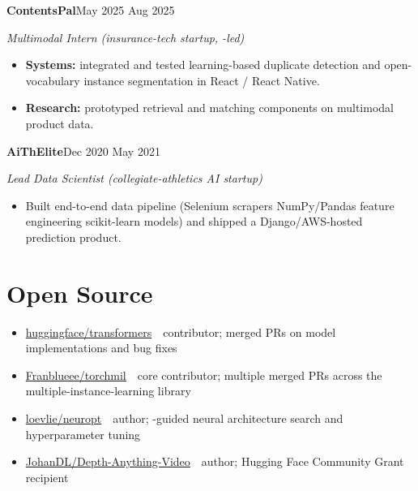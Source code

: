 \documentclass[10pt,letterpaper]{article}
\newcommand{\sansfam}{\sffamily}
\newcommand{\monofam}{\ttfamily}
\newcommand{\datestamp}[1]{{\sansfam\footnotesize\color{meta}\figureversion{lf}#1}}
\newcommand{\role}[2]{%
  \filbreak%
  \par\vspace{1pt}%
  \noindent\textbf{#1}\hfill\datestamp{#2}\par\nopagebreak}
\newcommand{\sub}[1]{\noindent\textit{\footnotesize\color{meta} #1}\par\nopagebreak}
\newcommand{\acro}[1]{\textls[80]{#1}}
\begin{document}
\role{ContentsPal}{May 2025 \textendash{} Aug 2025}
\sub{Multimodal \acro{AI} Intern (insurance-tech startup, \acro{MIT}-led)}
\begin{itemize}
  \item \textbf{Systems:} integrated and tested learning-based duplicate detection and open-vocabulary instance segmentation in React / React Native.
  \item \textbf{Research:} prototyped retrieval and matching components on multimodal product data.
\end{itemize}

\role{AiThElite}{Dec 2020 \textendash{} May 2021}
\sub{Lead Data Scientist (collegiate-athletics AI startup)}
\begin{itemize}
  \item Built end-to-end data pipeline (Selenium scrapers \textrightarrow{} NumPy/Pandas feature engineering \textrightarrow{} scikit-learn models) and shipped a Django/AWS-hosted prediction product.
\end{itemize}

\section{Open Source}

\begin{itemize}
  \item \href{https://github.com/huggingface/transformers}{\monofam huggingface/transformers} \,\textemdash\, contributor; merged PRs on model implementations and bug fixes
  \item \href{https://github.com/Franblueee/torchmil}{\monofam Franblueee/torchmil} \,\textemdash\, core contributor; multiple merged PRs across the multiple-instance-learning library
  \item \href{https://github.com/loevlie/neuropt}{\monofam loevlie/neuropt} \,\textemdash\, author; \acro{LLM}-guided neural architecture search and hyperparameter tuning
  \item \href{https://huggingface.co/spaces/JohanDL/Depth-Anything-Video}{\monofam JohanDL/Depth-Anything-Video} \,\textemdash\, author; Hugging Face Community Grant recipient
\end{itemize}

\end{document}
